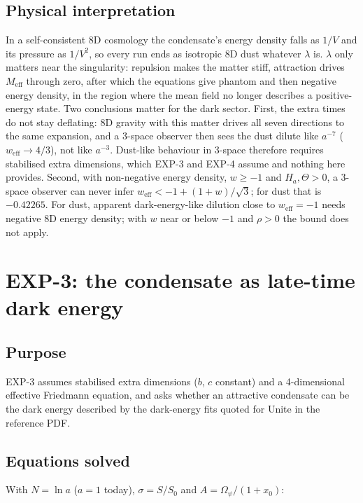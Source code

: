 \documentclass[11pt]{article}
\begin{document}
\subsection{Physical interpretation}

In a self-consistent 8D cosmology the condensate's energy density falls as $1/V$ and its pressure as $1/V^2$, so every run ends as isotropic 8D dust whatever $\lambda$ is. $\lambda$ only matters near the singularity: repulsion makes the matter stiff, attraction drives $M_{\mathrm{eff}}$ through zero, after which the equations give phantom and then negative energy density, in the region where the mean field no longer describes a positive-energy state. Two conclusions matter for the dark sector. First, the extra times do not stay deflating: 8D gravity with this matter drives all seven directions to the same expansion, and a 3-space observer then sees the dust dilute like $a^{-7}$ ($w_{\mathrm{eff}}\to4/3$), not like $a^{-3}$. Dust-like behaviour in 3-space therefore requires stabilised extra dimensions, which EXP-3 and EXP-4 assume and nothing here provides. Second, with non-negative energy density, $w\ge-1$ and $H_a,\Theta>0$, a 3-space observer can never infer $w_{\mathrm{eff}}<-1+(1+w)/\sqrt3$; for dust that is $-0.42265$. For dust, apparent dark-energy-like dilution close to $w_{\mathrm{eff}}=-1$ needs negative 8D energy density; with $w$ near or below $-1$ and $\rho>0$ the bound does not apply.

\section{EXP-3: the condensate as late-time dark energy}

\subsection{Purpose}

EXP-3 assumes stabilised extra dimensions ($b$, $c$ constant) and a 4-dimensional effective Friedmann equation, and asks whether an attractive condensate can be the dark energy described by the dark-energy fits quoted for Unite in the reference PDF.

\subsection{Equations solved}

With $N=\ln a$ ($a=1$ today), $\sigma=S/S_0$ and $A=\Omega_\psi/(1+x_0)$:
\end{document}
